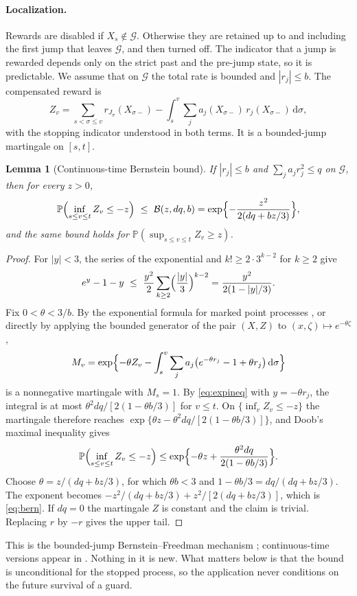 \documentclass[11pt,letterpaper]{article}
\theoremstyle{plain}
\newtheorem{lemma}[theorem]{Lemma}
\theoremstyle{definition}
\theoremstyle{remark}
\numberwithin{equation}{section}
\newcommand{\PP}{\mathbb P}
\newcommand{\cB}{\mathcal B}
\newcommand{\dd}{\,\mathrm d}
\begin{document}
\paragraph{Localization.}
Rewards are disabled if $X_s\notin\mathcal G$. Otherwise they are retained up to and including the first jump that leaves $\mathcal G$, and then turned off. The indicator that a jump is rewarded depends only on the strict past and the pre-jump state, so it is predictable. We assume that on $\mathcal G$ the total rate is bounded and $|r_j|\le b$. The compensated reward is
\begin{equation}\label{eq:Z}
 Z_v=\sum_{s<\sigma\le v}r_{J_\sigma}(X_{\sigma-})-\int_s^v\sum_ja_j(X_{\sigma-})\,r_j(X_{\sigma-})\dd\sigma ,
\end{equation}
with the stopping indicator understood in both terms. It is a bounded-jump martingale on $[s,t]$.

\begin{lemma}[Continuous-time Bernstein bound]\label{lem:bern}
If $|r_j|\le b$ and $\sum_ja_jr_j^2\le q$ on $\mathcal G$, then for every $z>0$,
\begin{equation}\label{eq:bern}
 \PP\Bigl(\inf_{s\le v\le t}Z_v\le-z\Bigr)\ \le\ \cB(z,dq,b)=\exp\Bigl\{-\frac{z^2}{2(dq+bz/3)}\Bigr\},
\end{equation}
and the same bound holds for $\PP(\sup_{s\le v\le t}Z_v\ge z)$.
\end{lemma}
\begin{proof}
For $|y|<3$, the series of the exponential and $k!\ge2\cdot3^{k-2}$ for $k\ge2$ give
\begin{equation}\label{eq:expineq}
 e^y-1-y\ \le\ \frac{y^2}2\sum_{k\ge2}\Bigl(\frac{|y|}3\Bigr)^{k-2}=\frac{y^2}{2(1-|y|/3)} .
\end{equation}
Fix $0<\theta<3/b$. By the exponential formula for marked point processes \cite{bremaud1981point}, or directly by applying the bounded generator of the pair $(X,Z)$ to $(x,\zeta)\mapsto e^{-\theta\zeta}$,
\[
 M_v=\exp\Bigl\{-\theta Z_v-\int_s^v\sum_ja_j\bigl(e^{-\theta r_j}-1+\theta r_j\bigr)\dd\sigma\Bigr\}
\]
is a nonnegative martingale with $M_s=1$. By \eqref{eq:expineq} with $y=-\theta r_j$, the integral is at most $\theta^2dq/[2(1-\theta b/3)]$ for $v\le t$. On $\{\inf_vZ_v\le-z\}$ the martingale therefore reaches $\exp\{\theta z-\theta^2dq/[2(1-\theta b/3)]\}$, and Doob's maximal inequality gives
\[
 \PP\Bigl(\inf_{s\le v\le t}Z_v\le-z\Bigr)\le\exp\Bigl\{-\theta z+\frac{\theta^2dq}{2(1-\theta b/3)}\Bigr\}.
\]
Choose $\theta=z/(dq+bz/3)$, for which $\theta b<3$ and $1-\theta b/3=dq/(dq+bz/3)$. The exponent becomes $-z^2/(dq+bz/3)+z^2/[2(dq+bz/3)]$, which is \eqref{eq:bern}. If $dq=0$ the martingale $Z$ is constant and the claim is trivial. Replacing $r$ by $-r$ gives the upper tail.
\end{proof}
This is the bounded-jump Bernstein--Freedman mechanism \cite{freedman1975tail}; continuous-time versions appear in \cite{vandegeer1995exponential,dzhaparidze2001bernstein}. Nothing in it is new. What matters below is that the bound is unconditional for the stopped process, so the application never conditions on the future survival of a guard.
\end{document}
